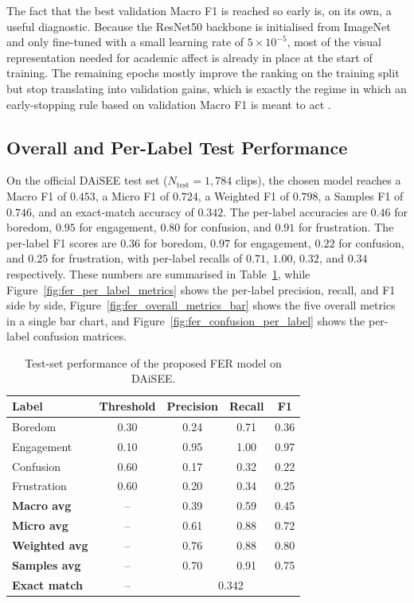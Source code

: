 The fact that the best validation Macro F1 is reached so early is, on its own, a useful diagnostic. Because the ResNet50 backbone is initialised from ImageNet \cite{he_resnet_2016} and only fine-tuned with a small learning rate of $5 \times 10^{-5}$, most of the visual representation needed for academic affect is already in place at the start of training. The remaining epochs mostly improve the ranking on the training split but stop translating into validation gains, which is exactly the regime in which an early-stopping rule based on validation Macro F1 is meant to act \cite{abedi_improving_2021,shiri_detection_2024,su_leveraging_2024}.

\subsection{Overall and Per-Label Test Performance}\label{sec:results_fer_overall}

On the official DAiSEE test set ($N_{\mathrm{test}} = 1{,}784$ clips), the chosen model reaches a Macro F1 of $0.453$, a Micro F1 of $0.724$, a Weighted F1 of $0.798$, a Samples F1 of $0.746$, and an exact-match accuracy of $0.342$. The per-label accuracies are $0.46$ for boredom, $0.95$ for engagement, $0.80$ for confusion, and $0.91$ for frustration. The per-label F1 scores are $0.36$ for boredom, $0.97$ for engagement, $0.22$ for confusion, and $0.25$ for frustration, with per-label recalls of $0.71$, $1.00$, $0.32$, and $0.34$ respectively. These numbers are summarised in Table~\ref{tab:fer_results}, while Figure~\ref{fig:fer_per_label_metrics} shows the per-label precision, recall, and F1 side by side, Figure~\ref{fig:fer_overall_metrics_bar} shows the five overall metrics in a single bar chart, and Figure~\ref{fig:fer_confusion_per_label} shows the per-label confusion matrices.

\begin{table}[H]
\centering
\caption{Test-set performance of the proposed FER model on DAiSEE.}
\label{tab:fer_results}
\begin{tabular}{lcccc}
\toprule
\textbf{Label} & \textbf{Threshold} & \textbf{Precision} & \textbf{Recall} & \textbf{F1} \\
\midrule
Boredom     & 0.30 & 0.24 & 0.71 & 0.36 \\
Engagement  & 0.10 & 0.95 & 1.00 & 0.97 \\
Confusion   & 0.60 & 0.17 & 0.32 & 0.22 \\
Frustration & 0.60 & 0.20 & 0.34 & 0.25 \\
\midrule
\textbf{Macro avg}    & --   & 0.39 & 0.59 & 0.45 \\
\textbf{Micro avg}    & --   & 0.61 & 0.88 & 0.72 \\
\textbf{Weighted avg} & --   & 0.76 & 0.88 & 0.80 \\
\textbf{Samples avg}  & --   & 0.70 & 0.91 & 0.75 \\
\textbf{Exact match}  & --   & \multicolumn{3}{c}{0.342} \\
\bottomrule
\end{tabular}
\end{table}

